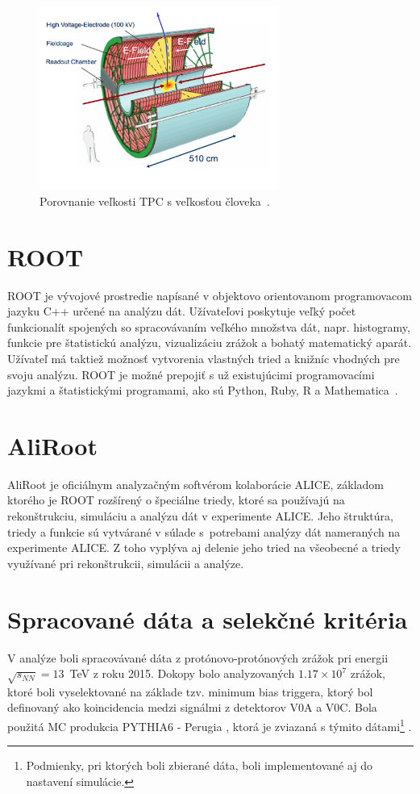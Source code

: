 \documentclass[thesismargins, thesislinespacing]{rnthesis}
\begin{document}
\begin{figure}[hbtp!]
	\begin{center}
	 	\includegraphics[width=0.7\textwidth]{./Obrazky_praca/tpc.png}
		\caption{Porovnanie veľkosti TPC s veľkosťou človeka~\cite{TPCobr}.}
		\label{tpc}
	\end{center}
\end{figure}

\section{ROOT}
ROOT je vývojové prostredie napísané v objektovo orientovanom programovacom jazyku C++ určené na analýzu dát. Užívateľovi poskytuje veľký počet funkcionalít spojených so spracovávaním veľkého množstva dát, napr. histogramy, funkcie pre štatistickú analýzu, vizualizáciu zrážok a bohatý matematický aparát. Užívateľ má taktiež možnosť vytvorenia vlastných tried a knižníc vhodných pre svoju analýzu. ROOT je možné prepojiť s už existujúcimi programovacími jazykmi a štatistickými programami, ako sú Python, Ruby, R a Mathematica~\cite{root}.

\section{AliRoot}
AliRoot \cite{aliroot} je oficiálnym analyzačným softvérom kolaborácie ALICE, základom kto\-ré\-ho je ROOT rozšírený o špeciálne triedy, ktoré sa používajú na rekonštrukciu, simuláciu a analýzu dát v experimente ALICE. Jeho štruktúra, triedy a funkcie sú vytvárané v súlade s~potrebami analýzy dát nameraných na experimente ALICE. Z toho vyplýva aj delenie jeho tried na všeobecné a triedy využívané pri rekonštrukcii, simulácii a analýze. 



\section{Spracované dáta a selekčné kritéria}
V analýze boli spracovávané dáta z protónovo-protónových zrážok pri energii $\sqrt{s_{NN}}=13$~TeV z roku 2015. Dokopy bolo analyzovaných $1.17\times10^7$ zrážok, ktoré boli vyselektované na základe tzv. minimum bias triggera, ktorý bol definovaný ako koincidencia medzi signálmi z detektorov V0A a V0C.
Bola použitá MC produkcia PYTHIA6 - Perugia \cite{perugia}, ktorá je zviazaná s týmito dátami\footnote{Podmienky, pri ktorých boli zbierané dáta, boli implementované aj do nastavení simulácie. } . 
\end{document}

